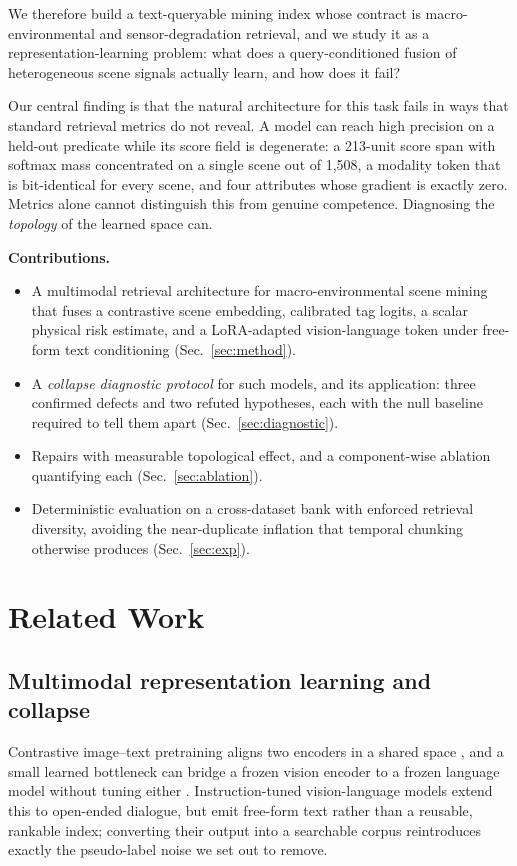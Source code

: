 \documentclass[10pt,twocolumn,letterpaper]{article}
\begin{document}
We therefore build a text-queryable mining index whose contract is
macro-environmental and sensor-degradation retrieval, and we study it as a
representation-learning problem: what does a query-conditioned fusion of
heterogeneous scene signals actually learn, and how does it fail?

Our central finding is that the natural architecture for this task fails
in ways that standard retrieval metrics do not reveal. A model can reach
high precision on a held-out predicate while its score field is
degenerate: a 213-unit score span with softmax mass concentrated on a
single scene out of 1{,}508, a modality token that is bit-identical for
every scene, and four attributes whose gradient is exactly zero. Metrics
alone cannot distinguish this from genuine competence. Diagnosing the
\emph{topology} of the learned space can.

\noindent\textbf{Contributions.}
\begin{itemize}\itemsep2pt
\item A multimodal retrieval architecture for macro-environmental scene
mining that fuses a contrastive scene embedding, calibrated tag logits, a
scalar physical risk estimate, and a LoRA-adapted vision-language token
under free-form text conditioning (Sec.~\ref{sec:method}).
\item A \emph{collapse diagnostic protocol} for such models, and its
application: three confirmed defects and two refuted hypotheses, each with
the null baseline required to tell them apart (Sec.~\ref{sec:diagnostic}).
\item Repairs with measurable topological effect, and a component-wise
ablation quantifying each (Sec.~\ref{sec:ablation}).
\item Deterministic evaluation on a cross-dataset bank with enforced
retrieval diversity, avoiding the near-duplicate inflation that temporal
chunking otherwise produces (Sec.~\ref{sec:exp}).
\end{itemize}

\section{Related Work}
\label{sec:related}

\subsection{Multimodal representation learning and collapse}
Contrastive image--text pretraining aligns two encoders in a shared space
\cite{clip,align,coca,siglip}, and a small learned bottleneck can bridge a
frozen vision encoder to a frozen language model without tuning either
\cite{blip,blip2}. Instruction-tuned vision-language models
\cite{flamingo,llava,qwen25vl} extend this to open-ended dialogue, but emit
free-form text rather than a reusable, rankable index; converting their
output into a searchable corpus reintroduces exactly the pseudo-label noise
we set out to remove.
\end{document}
